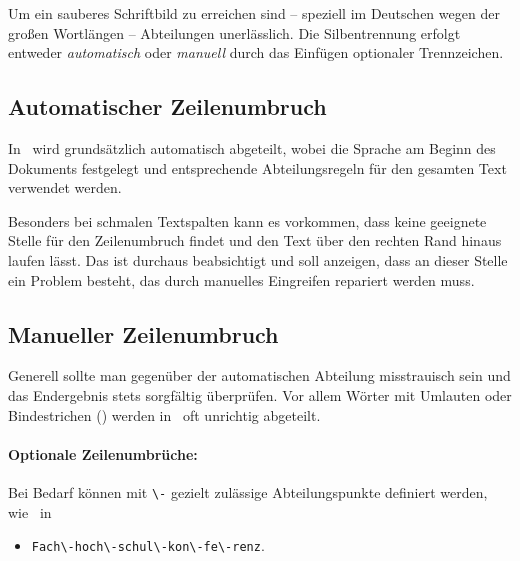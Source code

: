 Um ein sauberes Schriftbild zu erreichen sind -- speziell im
Deutschen wegen der großen Wortlängen -- Abteilungen unerlässlich.
Die Silbentrennung erfolgt entweder \emph{automatisch} oder \emph{manuell} durch
das Einfügen optionaler Trennzeichen. 


\subsection{Automatischer Zeilenumbruch}

In \latex\ wird grundsätzlich automatisch abgeteilt, wobei die Sprache am
Beginn des Dokuments festgelegt und entsprechende Abteilungsregeln
für den gesamten Text verwendet werden.

Besonders bei schmalen Textspalten kann es vorkommen, dass \latex
keine geeignete Stelle für den Zeilenumbruch findet und den Text
über den rechten Rand hinaus laufen lässt. Das ist durchaus
beabsichtigt und soll anzeigen, dass an dieser Stelle ein Problem
besteht, das durch manuelles Eingreifen repariert werden muss.



\subsection{Manueller Zeilenumbruch}

Generell sollte man gegenüber der automatischen Abteilung
misstrauisch sein und das Endergebnis stets sorgfältig überprüfen.
Vor allem Wörter mit Umlauten oder Bindestrichen (\su) werden in \latex\ 
oft unrichtig abgeteilt.


\paragraph{Optionale Zeilenumbrüche:} 
Bei Bedarf können mit \verb!\-! gezielt zulässige Abteilungspunkte 
definiert werden, wie \zB\ in
%
\begin{itemize}
\item[] \verb!Fach\-hoch\-schul\-kon\-fe\-renz!.
\end{itemize}

